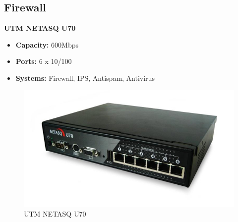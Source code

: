 \subsection{Firewall}
\textbf{UTM NETASQ U70}
\begin{itemize}
	\item \textbf{Capacity:} 600Mbps
	\item \textbf{Ports:} 6 x 10/100
	\item \textbf{Systems:} Firewall, IPS, Antispam, Antivirus  
\end{itemize}
 \begin{figure}[htbp]
	\begin{center}
        \includegraphics[scale = 0.5]{img/firewall.jpg}
        \caption{UTM NETASQ U70}
    \end{center}
\end{figure}